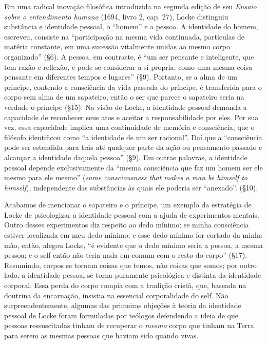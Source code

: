 Em uma radical inovação filosófica introduzida na segunda edição de seu
\emph{Ensaio sobre o entendimento humano} (1694, livro 2, cap. 27),
Locke distinguiu substância e identidade pessoal, o ``homem'' e a
pessoa. A identidade do homem, escreveu, consiste na ``participação na
mesma vida continuada, partículas de matéria constante, em uma sucessão
vitalmente unidas ao mesmo corpo organizado'' (§6). A pessoa, em
contraste, é ``um ser pensante e inteligente, que tem razão e reflexão,
e pode se considerar a si propria, como uma mesma coisa pensante em
diferentes tempos e lugares'' (§9). Portanto, se a alma de um príncipe,
contendo a consciência da vida passada do príncipe, é transferida para o
corpo sem alma de um sapateiro, então o ser que parece o sapateiro seria
na verdade o príncipe (§15). Na visão de Locke, a identidade pessoal
demanda a capacidade de reconhecer seus atos e aceitar a
responsabilidade por eles. Por sua vez, essa capacidade implica uma
continuidade de memória e consciência, que o filósofo identificou como
``a identidade de um ser racional''. Daí que a ``consciência pode ser
estendida para trás até qualquer parte da ação ou pensamento passado e
alcançar a identidade daquela pessoa'' (§9). Em outras palavras, a
identidade pessoal depende exclusivamente da ``mesma consciência que faz
um homem ser ele mesmo para ele mesmo'' (\emph{same consciousness that
makes a man be himself to himself}), independente das substâncias às
quais ele poderia ser ``anexado''. (§10).

Acabamos de mencionar o sapateiro e o príncipe, um exemplo da estratégia
de Locke de psicologizar a identidade pessoal com a ajuda de
experimentos mentais. Outro desses experimentos diz respeito ao dedo
mínimo: se minha consciência estiver localizada em meu dedo mínimo, e
esse dedo mínimo for cortado da minha mão, então, alegou Locke, ``é
evidente que o dedo mínimo seria a pessoa, a mesma pessoa; e o self
então não teria nada em comum com o resto do corpo'' (§17). Resumindo,
corpos se tornam coisas que temos, não coisas que somos; por outro lado,
a identidade pessoal se torna puramente psicológica e distinta da
identidade corporal. Essa perda do corpo rompia com a tradição cristã,
que, baseada na doutrina da encarnação, insistia na essencial
corporalidade do self. Não surpreendentemente, algumas das primeiras
objeções à teoria da identidade pessoal de Locke foram formuladas por
teólogos defendendo a ideia de que pessoas ressuscitadas tinham de
recuperar o \emph{mesmo} corpo que tinham na Terra para serem as mesmas
pessoas que haviam sido quando vivas.

